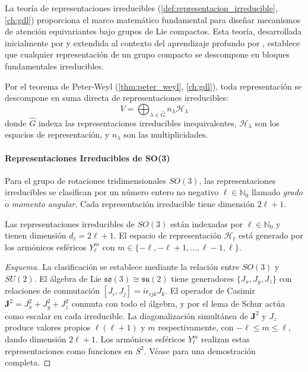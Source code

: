 La teoría de representaciones irreducibles (\autoref{def:representacion_irreducible}, \autoref{ch:gdl}) proporciona el marco matemático fundamental para diseñar mecanismos de atención equivariantes bajo grupos de Lie compactos. Esta teoría, desarrollada inicialmente por \citet{Peter1927} y extendida al contexto del aprendizaje profundo por \citet{kondor2018generalizationconvolutionalneural}, establece que cualquier representación de un grupo compacto se descompone en bloques fundamentales irreducibles.

Por el teorema de Peter-Weyl (\autoref{thm:peter_weyl}, \autoref{ch:gdl}), toda representación se descompone en suma directa de representaciones irreducibles:
\begin{equation}
V = \bigoplus_{\lambda \in \widehat{G}} n_\lambda \mathcal{H}_\lambda
\label{eq:peter_weyl_decomposition_attention}
\end{equation}
donde $\widehat{G}$ indexa las representaciones irreducibles inequivalentes, $\mathcal{H}_\lambda$ son los espacios de representación, y $n_\lambda$ son las multiplicidades.

\paragraph{Representaciones Irreducibles de SO(3)}

Para el grupo de rotaciones tridimensionales $SO(3)$, las representaciones irreducibles se clasifican por un número entero no negativo $\ell \in \mathbb{N}_0$ llamado \textit{grado} o \textit{momento angular}. Cada representación irreducible tiene dimensión $2\ell + 1$.

\begin{theorem}\label{thm:so3_irreps}
Las representaciones irreducibles de $SO(3)$ están indexadas por $\ell \in \mathbb{N}_0$ y tienen dimensión $d_\ell = 2\ell + 1$. El espacio de representación $\mathcal{H}_\ell$ está generado por los armónicos esféricos $Y_\ell^m$ con $m \in \{-\ell, -\ell+1, \ldots, \ell-1, \ell\}$.
\end{theorem}

\begin{proof}[Esquema]
La clasificación se establece mediante la relación entre $SO(3)$ y $SU(2)$. El álgebra de Lie $\mathfrak{so}(3) \cong \mathfrak{su}(2)$ tiene generadores $\{J_x, J_y, J_z\}$ con relaciones de conmutación $[J_i, J_j] = i\epsilon_{ijk}J_k$. El operador de Casimir $\mathbf{J}^2 = J_x^2 + J_y^2 + J_z^2$ conmuta con todo el álgebra, y por el lema de Schur actúa como escalar en cada irreducible. La diagonalización simultánea de $\mathbf{J}^2$ y $J_z$ produce valores propios $\ell(\ell+1)$ y $m$ respectivamente, con $-\ell \leq m \leq \ell$, dando dimensión $2\ell+1$. Los armónicos esféricos $Y_\ell^m$ realizan estas representaciones como funciones en $S^2$. Véase \citep{brocker1985representations} para una demostración completa.
\end{proof}

